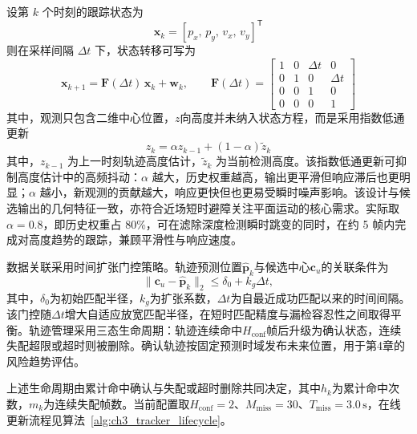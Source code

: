 设第 $k$ 个时刻的跟踪状态为
\begin{equation}
\mathbf{x}_k=[p_x,\,p_y,\,v_x,\,v_y]^{\mathsf{T}}
\end{equation}
则在采样间隔 $\Delta t$ 下，状态转移可写为
\begin{equation}
\mathbf{x}_{k+1}=\mathbf{F}(\Delta t)\,\mathbf{x}_k+\mathbf{w}_k,\qquad
\mathbf{F}(\Delta t)=
\begin{bmatrix}
1&0&\Delta t&0\\
0&1&0&\Delta t\\
0&0&1&0\\
0&0&0&1
\end{bmatrix}
\end{equation}
其中，观测只包含二维中心位置，$z$向高度并未纳入状态方程，而是采用指数低通更新
\begin{equation}
z_k=\alpha z_{k-1}+(1-\alpha)\tilde{z}_k
\end{equation}
其中，$z_{k-1}$ 为上一时刻轨迹高度估计，$\tilde{z}_k$ 为当前检测高度。该指数低通更新可抑制高度估计中的高频抖动：$\alpha$ 越大，历史权重越高，输出更平滑但响应滞后也更明显；$\alpha$ 越小，新观测的贡献越大，响应更快但也更易受瞬时噪声影响。该设计与候选输出的几何特征一致，亦符合近场短时避障关注平面运动的核心需求。实际取 $\alpha=0.8$，即历史权重占 80\%，可在滤除深度检测瞬时跳变的同时，在约 5 帧内完成对高度趋势的跟踪，兼顾平滑性与响应速度。

数据关联采用时间扩张门控策略。轨迹预测位置$\hat{\mathbf{p}}_k$与候选中心$\mathbf{c}_u$的关联条件为
\begin{equation}
\|\mathbf{c}_u-\hat{\mathbf{p}}_k\|_2\le \delta_0+k_g\Delta t,
\end{equation}
其中，$\delta_0$为初始匹配半径，$k_g$为扩张系数，$\Delta t$为自最近成功匹配以来的时间间隔。该门控随$\Delta t$增大自适应放宽匹配半径，在短时匹配精度与漏检容忍性之间取得平衡。轨迹管理采用三态生命周期：轨迹连续命中$H_{\mathrm{conf}}$帧后升级为确认状态，连续失配超限或超时则被删除。确认轨迹按固定预测时域发布未来位置，用于第4章的风险趋势评估。

上述生命周期由累计命中确认与失配或超时删除共同决定，其中$h_k$为累计命中次数，$m_k$为连续失配帧数。当前配置取$H_{\mathrm{conf}}=2$、$M_{\mathrm{miss}}=30$、$T_{\mathrm{miss}}=3.0\,\mathrm{s}$，在线更新流程见算法~\ref{alg:ch3_tracker_lifecycle}。

